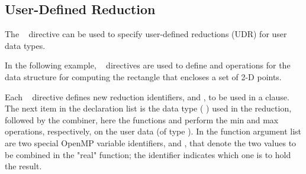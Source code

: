\subsection{User-Defined Reduction}
\label{subsec:UDR}

The ~ directive can be used to specify 
user-defined reductions (UDR) for user data types.




In the following example, ~ directives are used to define
 and  operations for the  data structure for computing
the rectangle that encloses a set of 2-D points.

Each ~ directive defines new reduction identifiers,
 and , to be used in a  clause. The next item in the
declaration list is the data type ( ) used in the reduction,
followed by the combiner, here the functions  and  perform
the min and max operations, respectively, on the user data (of type  ).
In the function argument list are two special OpenMP variable identifiers,  and ,
that denote the two values to be combined in the "real" function;
the  identifier indicates which one is to hold the result.

